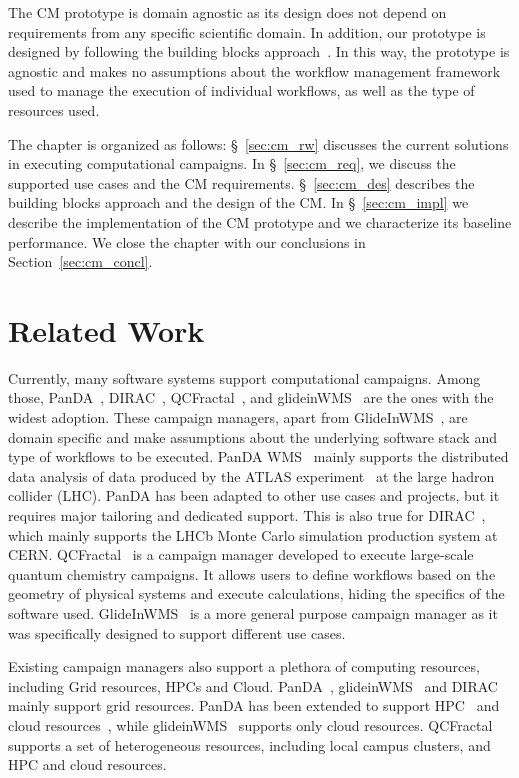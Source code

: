The CM prototype is domain agnostic as its design does not depend
on requirements from any specific scientific domain. In addition, our prototype
is designed by following the building blocks
approach~\cite{turilli2019middleware}. In this way, the prototype is agnostic
and makes no assumptions about the workflow management framework used to manage
the execution of individual workflows, as well as the type of resources used.

The chapter is organized as follows: \S~\ref{sec:cm_rw} discusses the current
solutions in executing computational campaigns. In \S~\ref{sec:cm_req}, we discuss the
supported use cases and the CM requirements.
\S~\ref{sec:cm_des} describes the building blocks approach and the design
of the CM. In \S~\ref{sec:cm_impl} we describe the
implementation of the CM prototype and we characterize its
baseline performance. We close the chapter with our conclusions in
Section~\ref{sec:cm_concl}.

\section{Related Work}

Currently, many software systems support computational campaigns. Among those,
PanDA~\cite{maeno2008panda}, DIRAC~\cite{casajus2010dirac},
QCFractal~\cite{qcfractal}, and glideinWMS~\cite{sfiligoi2008glidein} are the
ones with the widest adoption. These campaign managers, apart from
GlideInWMS~\cite{sfiligoi2008glidein}, are domain specific and make assumptions
about the underlying software stack and type of workflows to be executed. PanDA
WMS~\cite{maeno2008panda} mainly supports the distributed data analysis of data
produced by the ATLAS experiment~\cite{atlas} at the large hadron collider
(LHC). PanDA has been adapted to other use cases and projects, but it requires
major tailoring and dedicated support. This is also true for
DIRAC~\cite{tsaregorodtsev2003dirac}, which mainly supports the LHCb Monte Carlo
simulation production system at CERN. QCFractal~\cite{qcfractal} is a campaign
manager developed to execute large-scale quantum chemistry campaigns. It allows
users to define workflows based on the geometry of physical systems and execute
calculations, hiding the specifics of the software used.
GlideInWMS~\cite{sfiligoi2008glidein} is a more general purpose campaign manager
as it was specifically designed to support different use cases.

Existing campaign managers also support a plethora of computing resources,
including Grid resources, HPCs and Cloud. PanDA~\cite{maeno2008panda},
glideinWMS~\cite{sfiligoi2008glidein} and DIRAC~\cite{casajus2010dirac} mainly
support grid resources. PanDA has been extended to support
HPC~\cite{de2015future, de2016accelerating} and cloud
resources~\cite{de2016accelerating}, while glideinWMS~\cite{sfiligoi2008glidein}
supports only cloud resources. QCFractal~\cite{qcfractal} supports a set of
heterogeneous resources, including local campus clusters, and HPC and
cloud resources.

